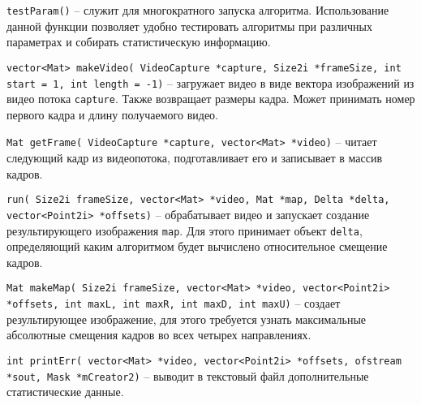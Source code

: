 \texttt{testParam()} -- служит для многократного запуска алгоритма. Использование данной функции позволяет удобно тестировать алгоритмы при различных параметрах и собирать статистическую информацию. 

\texttt{vector<Mat> makeVideo( VideoCapture *capture, Size2i *frameSize, int start = 1, int length = -1)} -- загружает видео в виде вектора изображений из видео потока \texttt{capture}. Также возвращает размеры кадра. Может принимать номер первого кадра и длину получаемого видео. 

\texttt{Mat getFrame( VideoCapture *capture, vector<Mat> *video)} -- читает следующий кадр из видеопотока, подготавливает его и записывает в массив кадров.

\texttt{run( Size2i frameSize, vector<Mat> *video, Mat *map, Delta *delta,
    vector<Point2i> *offsets)} -- обрабатывает видео и запускает создание результирующего изображения \texttt{map}. Для этого принимает объект \texttt{delta}, определяющий каким алгоритмом будет вычислено относительное смещение кадров.

\texttt{Mat makeMap( Size2i frameSize, vector<Mat> *video, vector<Point2i> *offsets,
    int maxL, int maxR, int maxD, int maxU)} -- создает результирующее изображение, для этого требуется узнать максимальные абсолютные смещения кадров во всех четырех направлениях.

\texttt{int printErr( vector<Mat> *video, vector<Point2i> *offsets, ofstream *sout, Mask *mCreator2)} -- выводит в текстовый файл дополнительные статистические данные.

